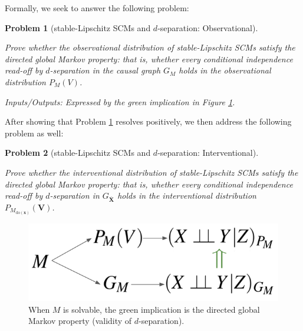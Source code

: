 \documentclass[letterpaper,10pt]{article}
\newtheorem{problem}{Problem}
\begin{document}

Formally, we seek to answer the following problem:

\begin{problem}[stable-Lipschitz SCMs and $d$-separation: Observational]
\label{prob:obs}

Prove whether the observational distribution of stable-Lipschitz SCMs satisfy the directed global Markov property: that is, whether every conditional independence read-off by $d$-separation in the causal graph $G_M$ holds in the observational distribution $P_M(V)$.

Inputs/Outputs: Expressed by the green implication in Figure \ref{fig:dsep-Markov-flow}.
\end{problem}

After showing that Problem \ref{prob:obs} resolves positively, we then address the following problem as well:

\begin{problem}[stable-Lipschitz SCMs and $d$-separation: Interventional]
\label{prob:int}

Prove whether the interventional distribution of stable-Lipschitz SCMs satisfy the directed global Markov property: that is, whether every conditional independence read-off by $d$-separation in $G_{\overline{\mathbf{X}}}$ holds in the interventional distribution $P_{M_{\text{do}(\mathbf{x})}}(\mathbf{V})$.
\end{problem}




\begin{figure}
\centering
\includegraphics[width=.35\linewidth]{pics/my_own/dsep_Markov_flow.png}
\caption{When $M$ is solvable, the green implication is the directed global Markov property (validity of $d$-separation).}
\label{fig:dsep-Markov-flow}
\end{figure}
\end{document}
